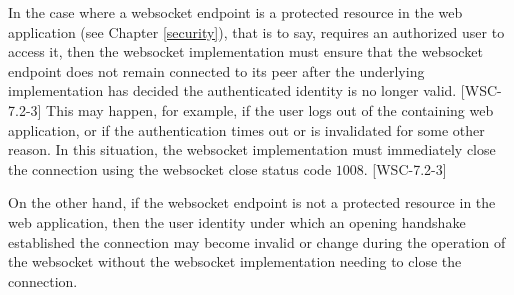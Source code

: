 In the case where a websocket endpoint is a protected resource in the web application (see Chapter \ref{security}), that is to say, requires an authorized user to access it, then the websocket implementation must ensure that the websocket endpoint does not remain connected to its peer after the underlying implementation has decided the authenticated identity is no longer valid. [WSC-7.2-3] This may happen, for example, if the user logs out of the containing web application, or if the authentication times out or is invalidated for some other reason. In this situation, the websocket implementation must immediately close the connection using the websocket close status code $1008$. [WSC-7.2-3]

On the other hand, if the websocket endpoint is not a protected resource in the web application, then the user identity under which an opening handshake established the connection may become invalid or change during the operation of the websocket without the websocket implementation needing to close the connection.